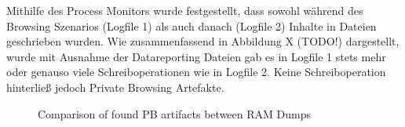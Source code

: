 \begin{appendices}
Mithilfe des Process Monitors wurde festgestellt, dass sowohl während des Browsing Szenarios (Logfile 1) als auch danach (Logfile 2) Inhalte in Dateien geschrieben wurden. Wie zusammenfassend in Abbildung X (TODO!) dargestellt, wurde mit Ausnahme der Datareporting Dateien gab es in Logfile 1 stets mehr oder genauso viele Schreiboperationen wie in Logfile 2.
Keine Schreiboperation hinterließ jedoch Private Browsing Artefakte.
\begin{figure}[h!]
	\centerline{}
	\label{chart:final-criteria}  
	\caption{Comparison of found PB artifacts between RAM Dumps}
\end{figure}




\end{appendices}
